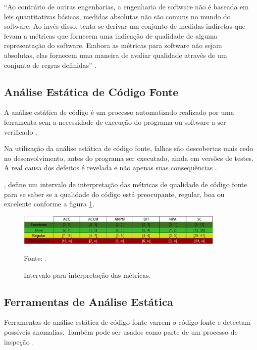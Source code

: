 \begin{citacao}
“Ao contrário de outras engenharias, a engenharia de software não é baseada em leis quantitativas básicas, medidas absolutas não são comuns no mundo do software. Ao invés disso, tenta-se derivar um conjunto de medidas indiretas que levam a métricas que fornecem uma indicação de qualidade de alguma representação do software. Embora as métricas para software não sejam absolutas, elas fornecem uma maneira de avaliar qualidade através de um conjunto de regras definidas” \cite[pág.~]{bueno2011}.
\end{citacao}

\subsection{Análise Estática de Código Fonte}

A análise estática de código é um processo automatizado realizado por uma ferramenta sem a necessidade de execução do programa ou software a ser verificado \cite[pág.~64]{chess2007}.

Na utilização da análise estática de código fonte, falhas são descobertas mais cedo no desenvolvimento, antes do programa ser executado, ainda em versões de testes. A real causa dos defeitos é revelada e não apenas suas consequências \cite[pág.~19]{melo2011}.

, define um intervalo de interpretação das métricas de qualidade de código fonte para se saber se a qualidade do código está preocupante, regular, boa ou excelente conforme a figura \ref{intervalosMetricas}.

\begin{figure}[H]
\centering
\includegraphics[width=0.9\textwidth]{figuras/intervalosMetricas}
\caption{Intervalo para interpretação das métricas.}{Fonte: .} 
\label{intervalosMetricas}
\end{figure}

\subsection{Ferramentas de Análise Estática}

Ferramentas de análise estática de código fonte varrem o código fonte e detectam possíveis anomalias. Também pode ser usados como parte de um processo de inspeção \cite[pág.~345]{sommerville}.

